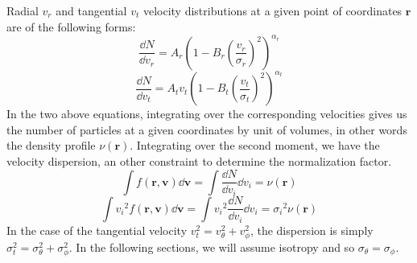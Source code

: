Radial $v_r$ and tangential $v_t$ velocity distributions at a given point of
coordinates $\textbf{r}$ are of the following forms:
%
\begin{equation}
    \frac{\dd N}{\dd v_r} =
    A_r{\left(1-B_r{\left(\frac{v_r}{\sigma_r}\right)} ^2\right)}^{\alpha_r}
\end{equation}
%
\begin{equation}
    \frac{\dd N}{\dd v_t}=
    A_t v_t
    {\left(1-B_t{\left(\frac{v_t}{\sigma_t}\right)}^2\right)}^{\alpha_t}
\end{equation}
%
In the two above equations, integrating over the corresponding velocities
gives us the number of particles at a given coordinates by unit of volumes,
in other words the density profile $\nu\left(\textbf{r}\right)$. Integrating
over the second moment, we have the velocity dispersion, an other constraint
to determine the normalization factor.
%
\begin{equation}
    \label{eq:mom0}
    \int f \left(\textbf{r},\textbf{v}\right)\dd\textbf{v}=
    \int\frac{\dd N}{\dd v_i}\dd v_i=
    \nu\left(\textbf{r}\right)
\end{equation}
%
\begin{equation}
    \int{v_i}^2 f \left(\textbf{r},\textbf{v}\right)\dd\textbf{v}=
    \int{v_i}^2\frac{\dd N}{\dd v_i}\dd v_i=
    {\sigma_i}^2\nu\left(\textbf{r}\right)
\end{equation}
%
In the case of the tangential velocity $v_t^2=v_\theta^2+v_\phi^2$, the
dispersion is simply $\sigma_t^2=\sigma_\theta^2+\sigma_\phi^2$. In the
following sections, we will assume isotropy and so
$\sigma_\theta=\sigma_\phi$.


